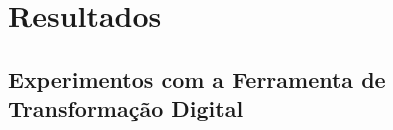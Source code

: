 \chapter{Resultados}
\label{ch:resultados}

\section{Experimentos com a Ferramenta de Transformação Digital}

